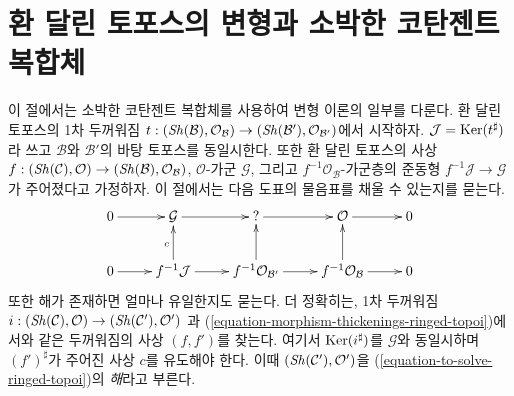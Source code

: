 \section{환 달린 토포스의 변형과 소박한 코탄젠트 복합체}
\label{section-deformations-ringed-topoi}

\noindent
이 절에서는 소박한 코탄젠트 복합체를 사용하여 변형 이론의 일부를
다룬다. 환 달린 토포스의 1차 두꺼워짐
$t : (\mathop{\mathit{Sh}}\nolimits(\mathcal{B}), \mathcal{O}_\mathcal{B}) \to
(\mathop{\mathit{Sh}}\nolimits(\mathcal{B}'), \mathcal{O}_{\mathcal{B}'})$에서 시작하자.
$\mathcal{J} = \mathop{\mathrm{Ker}}(t^\sharp)$라 쓰고 $\mathcal{B}$와 $\mathcal{B}'$의
바탕 토포스를 동일시한다. 또한 환 달린 토포스의 사상
$f : (\mathop{\mathit{Sh}}\nolimits(\mathcal{C}), \mathcal{O}) \to
(\mathop{\mathit{Sh}}\nolimits(\mathcal{B}), \mathcal{O}_\mathcal{B})$, $\mathcal{O}$-가군
$\mathcal{G}$, 그리고 $f^{-1}\mathcal{O}_\mathcal{B}$-가군층의 준동형
$f^{-1}\mathcal{J} \to \mathcal{G}$가 주어졌다고 가정하자. 이 절에서는
다음 도표의 물음표를 채울 수 있는지를 묻는다.
\begin{equation}
\label{equation-to-solve-ringed-topoi}
\vcenter{
\xymatrix{
0 \ar[r] & \mathcal{G} \ar[r] & {?} \ar[r] & \mathcal{O} \ar[r] & 0 \\
0 \ar[r] & f^{-1}\mathcal{J} \ar[u]^c \ar[r] &
f^{-1}\mathcal{O}_{\mathcal{B}'} \ar[u] \ar[r] &
f^{-1}\mathcal{O}_\mathcal{B} \ar[u] \ar[r] & 0
}
}
\end{equation}
또한 해가 존재하면 얼마나 유일한지도 묻는다. 더 정확히는, 1차 두꺼워짐
$i : (\mathop{\mathit{Sh}}\nolimits(\mathcal{C}), \mathcal{O}) \to (\mathop{\mathit{Sh}}\nolimits(\mathcal{C}'), \mathcal{O}')$
과 (\ref{equation-morphism-thickenings-ringed-topoi})에서와 같은
두꺼워짐의 사상 $(f, f')$를 찾는다. 여기서 $\mathop{\mathrm{Ker}}(i^\sharp)$를
$\mathcal{G}$와 동일시하며 $(f')^\sharp$가 주어진 사상 $c$를 유도해야
한다. 이때 $(\mathop{\mathit{Sh}}\nolimits(\mathcal{C}'), \mathcal{O}')$을
(\ref{equation-to-solve-ringed-topoi})의 {\it 해}라고 부른다.


